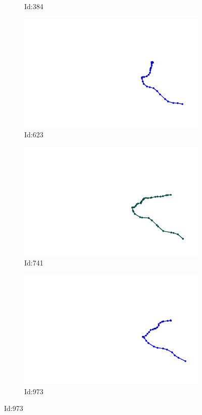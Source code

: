 \documentclass[12pt,twoside]{report}
\begin{document}
\begin{figure}
\begin{subfigure}[b]{0.20\textwidth}
\caption{Id:384}
\end{subfigure}
\begin{subfigure}[b]{0.20\textwidth}
\centering
\includegraphics[width=\textwidth]{../../trajectories/623.png}
\caption{Id:623}
\end{subfigure}
\begin{subfigure}[b]{0.20\textwidth}
\centering
\includegraphics[width=\textwidth]{../../trajectories/741.png}
\caption{Id:741}
\end{subfigure}
\begin{subfigure}[b]{0.20\textwidth}
\centering
\includegraphics[width=\textwidth]{../../trajectories/973.png}
\caption{Id:973}
\end{subfigure}
\end{figure}
\end{document}
